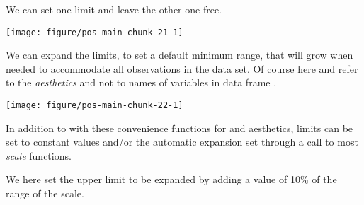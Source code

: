\documentclass[krantz2]{krantz}\usepackage{knitr}%
\begin{document}
We can set one limit and leave the other one free.

\begin{knitrout}\footnotesize
{}\color{fgcolor}\begin{kframe}
\begin{alltt}
  \hlopt{+} \hlstd{()} \hlopt{+} \hlstd{(}\hlstd{,} \hlstd{)}
\end{alltt}
\end{kframe}

{\centering \texttt{[image: figure/pos-main-chunk-21-1]} 

}



\end{knitrout}

We can expand the limits, to set a default minimum range, that will grow when needed to accommodate all observations in the data set. Of course here  and  refer to the \emph{aesthetics} and not to names of variables in data frame .

\begin{knitrout}\footnotesize
{}\color{fgcolor}\begin{kframe}
\begin{alltt}
  \hlopt{+} \hlstd{()} \hlopt{+} \hlstd{(} \hlstd{=} \hlstd{,}  \hlstd{=} \hlstd{)}
\end{alltt}
\end{kframe}

{\centering \texttt{[image: figure/pos-main-chunk-22-1]} 

}



\end{knitrout}

In addition to with these convenience functions for  and  aesthetics, limits can be set to constant values and/or the automatic expansion set through a call to most \emph{scale} functions.

We here set the upper limit to be expanded by adding a value of 10\% of the range of the scale.
\end{document}
